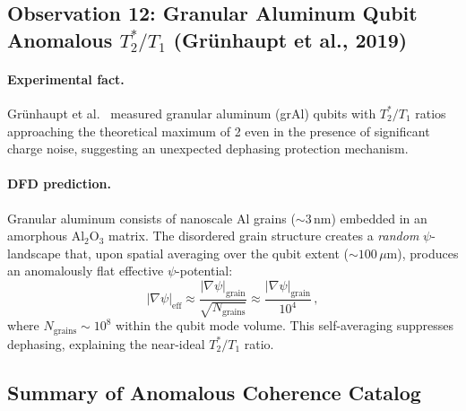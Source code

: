 \documentclass[aps,prl,twocolumn,superscriptaddress,nofootinbib,longbibliography]{revtex4-2}
\begin{document}
\subsection{Observation 12: Granular Aluminum Qubit Anomalous
$T_2^*/T_1$ (Grünhaupt et al., 2019)}

\paragraph{Experimental fact.} Gr\"unhaupt et al.~\cite{Grunhaupt2019}
measured granular aluminum (grAl) qubits with $T_2^*/T_1$ ratios
approaching the theoretical maximum of 2 even in the presence of
significant charge noise, suggesting an unexpected dephasing protection
mechanism.

\paragraph{DFD prediction.} Granular aluminum consists of nanoscale
Al grains ($\sim 3$\,nm) embedded in an amorphous Al$_2$O$_3$ matrix.
The disordered grain structure creates a \emph{random} $\psi$-landscape
that, upon spatial averaging over the qubit extent ($\sim 100\,\mu$m),
produces an anomalously flat effective $\psi$-potential:
\begin{equation}
|\nabla\psi|_{\text{eff}} \approx \frac{|\nabla\psi|_{\text{grain}}}
{\sqrt{N_{\text{grains}}}}
\approx \frac{|\nabla\psi|_{\text{grain}}}{10^4}\,,
\end{equation}
where $N_{\text{grains}} \sim 10^8$ within the qubit mode volume. This
self-averaging suppresses dephasing, explaining the near-ideal
$T_2^*/T_1$ ratio.

\subsection{Summary of Anomalous Coherence Catalog}
\end{document}
